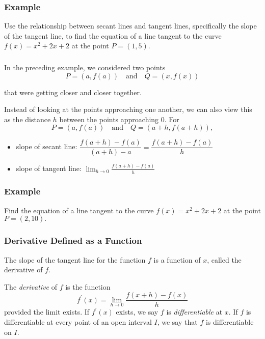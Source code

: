 \documentclass[14pt]{beamer}
\begin{document}
\begin{frame}
\frametitle{Example}
Use the relationship between secant lines and tangent lines, specifically the slope of the tangent line, to find the equation of a line tangent to the curve $f(x)=x^2+2x+2$ at the point $P=(1,5)$.
\end{frame}

\begin{frame}
\frametitle{}
\small
In the preceding example, we considered two points 
\vspace{-0.5pc}
\[P=\left(a,f(a)\right)\quad\text{and}\quad Q=\left(x,f(x)\right)\]

\vspace{-0.5pc}
that were getting closer and closer together.

\vspace{3pc}
Instead of looking at the points approaching one another, we can also view this as the distance $h$ between the points approaching 0.  For 
\vspace{-0.5pc}
\[P=\left(a,f(a)\right)\quad\text{and}\quad Q=\left(a+h,f(a+h)\right),\]
\end{frame}

\begin{frame}
\footnotesize
\begin{itemize}
\item slope of secant line:  $\dfrac{f(a+h)-f(a)}{(a+h)-a}= \dfrac{f(a+h)-f(a)}{h}$

\vspace{1.5pc}
\item slope of tangent line:  $\displaystyle\lim_{h \to 0} \frac{f(a+h)-f(a)}{h}$
\end{itemize}
\end{frame}

\begin{frame}
\frametitle{}
\end{frame}

\begin{frame}
\frametitle{Example}
Find the equation of a line tangent to the curve $f(x)=x^2+2x+2$ at the point $P=(2,10).$
\end{frame}

\begin{frame}
\frametitle{Derivative Defined as a Function}
\small
The slope of the tangent line for the function $f$ is a function of $x$, called the derivative of $f$.
\begin{dfn}
\footnotesize
The \emph{derivative} of $f$ is the function 
$$f^{\prime}(x)=\lim_{h \to 0} \frac{f(x+h)-f(x)}{h}$$
provided the limit exists.  If $f^{\prime}(x)$ exists, we say $f$ is \emph{differentiable} at $x$.  If $f$ is differentiable at every point of an open interval $I$, we say that $f$ is differentiable on $I$.
\end{dfn}
\end{frame}
\end{document}
